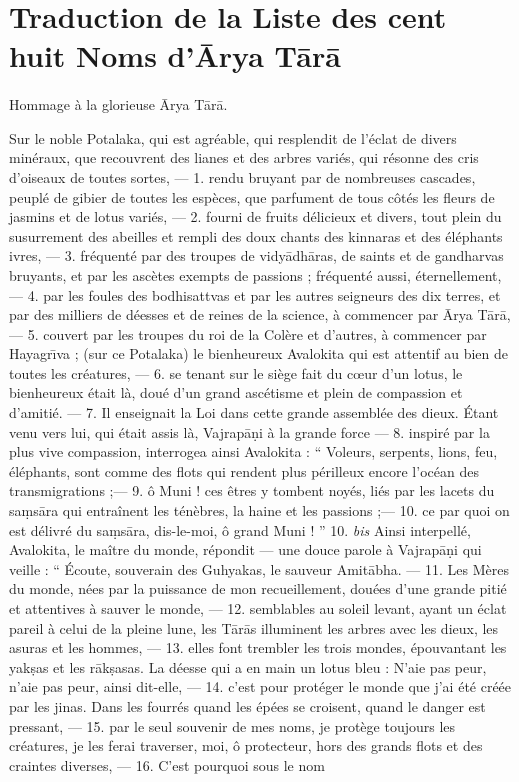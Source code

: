 \documentclass[a4paper, 11pt, oneside, french]{article}
\begin{document}
\section{Traduction de la Liste des cent huit Noms d'\={A}rya T\={a}r\={a}}
\paragraph{}
Hommage à la glorieuse \={A}rya T\={a}r\={a}.

\bigskip

Sur le noble Potalaka, qui est agréable, qui resplendit de l'éclat de divers minéraux, que recouvrent des lianes et des arbres variés, qui résonne des cris d'oiseaux de toutes sortes, --- 1. rendu bruyant par de nombreuses cascades, peuplé de gibier de toutes les espèces, que parfument de tous côtés les fleurs de jasmins et de lotus variés, --- 2. fourni de fruits délicieux et divers, tout plein du susurrement des abeilles et rempli des doux chants des kinnaras et des éléphants ivres, --- 3. fréquenté par des troupes de vidy\={a}dh\={a}ras, de saints et de gandharvas bruyants, et par les ascètes exempts de passions ; fréquenté aussi, éternellement, --- 4. par les foules des bodhisattvas et par les autres seigneurs des dix terres, et par des milliers de déesses et de reines de la science, à commencer par \={A}rya T\={a}r\={a}, --- 5. couvert par les troupes du roi de la Colère et d'autres, à commencer par Hayagr\={\i}va ; (sur ce Potalaka) le bienheureux Avalokita qui est attentif au bien de toutes les créatures, --- 6. se tenant sur le siège fait du cœur d'un lotus, le bienheureux était là, doué d'un grand ascétisme et plein de compassion et d'amitié. --- 7. Il enseignait la Loi dans cette grande assemblée des dieux. Étant venu vers lui, qui était assis là, Vajrap\={a}\d{n}i à la grande force --- 8. inspiré par la plus vive compassion, interrogea ainsi Avalokita : `` Voleurs, serpents, lions, feu, éléphants, sont comme des flots qui rendent plus périlleux encore l'océan des transmigrations ;--- 9. ô Muni ! ces êtres y tombent noyés, liés par les lacets du sa\d{m}s\={a}ra qui entraînent les ténèbres, la haine et les passions ;--- 10. ce par quoi on est délivré du sa\d{m}s\={a}ra, dis-le-moi, ô grand Muni ! '' 10. \emph{bis} Ainsi interpellé, Avalokita, le maître du monde, répondit --- une douce parole à Vajrap\={a}\d{n}i qui veille : `` Écoute, souverain des Guhyakas, le sauveur Amit\={a}bha. --- 11. Les Mères du monde, nées par la puissance de mon recueillement, douées d'une grande pitié et attentives à sauver le monde, --- 12. semblables au soleil levant, ayant un éclat pareil à celui de la pleine lune, les T\={a}r\={a}s illuminent les arbres avec les dieux, les asuras et les hommes, --- 13. elles font trembler les trois mondes, épouvantant les yak\d{s}as et les r\={a}k\d{s}asas. La déesse qui a en main un lotus bleu : N'aie pas peur, n'aie pas peur, ainsi dit-elle, --- 14. c'est pour protéger le monde que j'ai été créée par les jinas. Dans les fourrés quand les épées se croisent, quand le danger est pressant, --- 15. par le seul souvenir de mes noms, je protège toujours les créatures, je les ferai traverser, moi, ô protecteur, hors des grands flots et des craintes diverses, --- 16. C'est pourquoi sous le nom 
\end{document}
